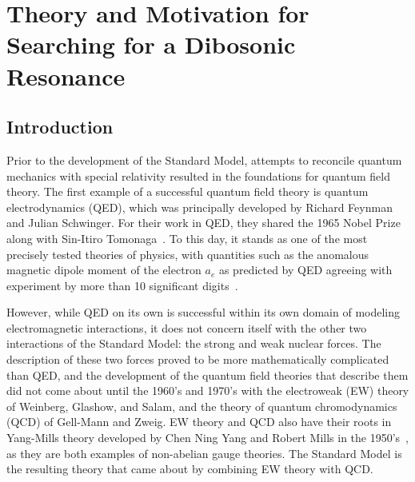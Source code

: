 
\chapter{Theory and Motivation for Searching for a Dibosonic Resonance}
\label{chap:theory}

\section{Introduction}

Prior to the development of the Standard Model, attempts to reconcile quantum mechanics with special relativity resulted in the foundations for quantum field theory.
The first example of a successful quantum field theory is quantum electrodynamics (QED), which was principally developed by Richard Feynman and Julian Schwinger.
For their work in QED, they shared the 1965 Nobel Prize along with Sin-Itiro Tomonaga~\cite{NobelPrize:1965-Physics}.
To this day, it stands as one of the most precisely tested theories of physics, with quantities such as the anomalous magnetic dipole moment of the electron $a_e$ as predicted by QED agreeing with experiment by more than 10 significant digits~\cite{Aoyama_2015}.

However, while QED on its own is successful within its own domain of modeling electromagnetic interactions, it does not concern itself with the other two interactions of the Standard Model: the strong and weak nuclear forces.
The description of these two forces proved to be more mathematically complicated than QED, and the development of the quantum field theories that describe them did not come about until the 1960's and 1970's with the electroweak (EW) theory of Weinberg, Glashow, and Salam, and the theory of quantum chromodynamics (QCD) of Gell-Mann and Zweig.
EW theory and QCD also have their roots in Yang-Mills theory developed by Chen Ning Yang and Robert Mills in the 1950's~\cite{1954PhRv...96..191Y}, as they are both examples of non-abelian gauge theories.
The Standard Model is the resulting theory that came about by combining EW theory with QCD\footnotemark.


